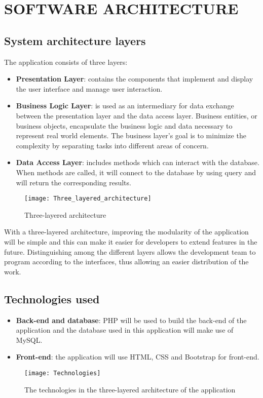 \section{SOFTWARE ARCHITECTURE}
\subsection{System architecture layers}
The application consists of three layers:
\begin{itemize}
	\item \textbf{Presentation Layer}: contains the components that implement and display the user interface and manage user interaction.
	\item \textbf{Business Logic Layer}: is used as an intermediary for data exchange between the presentation layer and the data access layer. Business entities, or business objects, encapsulate the business logic and data necessary to represent real world elements. The business layer's goal is to minimize the complexity by separating tasks into different areas of concern.  
	\item \textbf{Data Access Layer}: includes methods which can interact with the database. When methods are called, it will connect to the database by using query and will return the corresponding results.  
\end{itemize} 
\begin{figure}[H]
	\centering
	\texttt{[image: Three\_layered\_architecture]}
	\caption{Three-layered architecture}
\end{figure}
With a three-layered architecture, improving the modularity of the application will be simple and this can make it easier for developers to extend features in the future. Distinguishing among the different layers allows the development team to program according to the interfaces, thus allowing an easier distribution of the work.  
\subsection{Technologies used}
\begin{itemize}
	\item \textbf{Back-end and database}: PHP will be used to build the back-end of the application and the database used in this application will make use of MySQL.
	\item \textbf{Front-end}: the application will use HTML, CSS and Bootstrap for front-end.
\end{itemize}
\begin{figure}[H]
	\centering
	\texttt{[image: Technologies]}
	\caption{The technologies in the three-layered architecture of the application}
\end{figure}